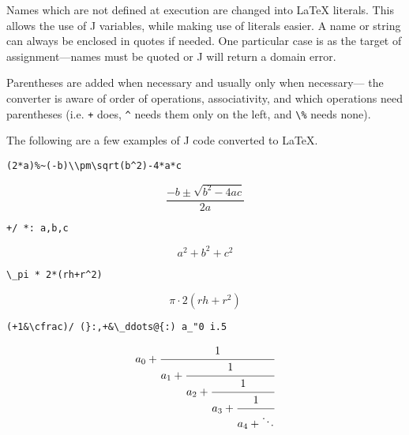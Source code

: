 \documentclass{article}
\newcommand{\code}[1]{\lstinline`#1`}
\begin{document}
Names which are not defined at execution are changed into LaTeX literals.
This allows the use of J variables, while making use of literals easier. 
A name or string can always be enclosed in quotes if needed.
One particular case is as the target of assignment---names must be quoted
or J will return a domain error.

Parentheses are added when necessary and usually only when necessary---
the converter is aware of order of operations, associativity, and which
operations need parentheses (i.e. \code{+} does, \code{^} needs them
only on the left, and \code{\%} needs none).

The following are a few examples of J code converted to LaTeX.
\begin{lstlisting}
(2*a)%~(-b)\\pm\sqrt(b^2)-4*a*c
\end{lstlisting}
\[\frac{-b \pm \sqrt{b^2-4 a c}}{2 a}\]
\begin{lstlisting}
+/ *: a,b,c
\end{lstlisting}
\[a^2+b^2+c^2\]
\begin{lstlisting}
\_pi * 2*(rh+r^2)
\end{lstlisting}
\[\pi\cdot 2 (rh+r^2)\]
\begin{lstlisting}
(+1&\cfrac)/ (}:,+&\_ddots@{:) a_"0 i.5
\end{lstlisting}
\[a_0+\cfrac{1}{a_1+\cfrac{1}{a_2+\cfrac{1}{a_3+\cfrac{1}{a_4+\ddots}}}}\]
\end{document}
